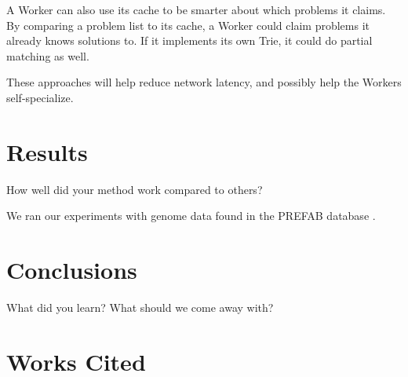 \documentclass[11pt]{article}
\begin{document}
A Worker can also use its cache to be smarter about which problems it claims. By comparing a problem list to its cache, a Worker could claim problems it already knows solutions to. If it implements its own Trie, it could do partial matching as well.

These approaches will help reduce network latency, and possibly help the Workers self-specialize.


\section{Results}

How well did your method work compared to others?

We ran our experiments with genome data found in the PREFAB database \cite{Edgar:04}.


\section{Conclusions} 

What did you learn? What should we come away with?


\section{Works Cited}
\end{document}
